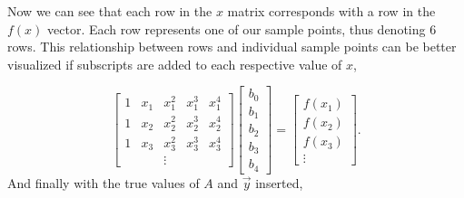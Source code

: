 \par Now we can see that each row in the $x$ matrix corresponds with a row in the $f(x)$ vector. Each row represents one of our sample points, thus denoting 6 rows. This relationship between rows and individual sample points can be better visualized if subscripts are added to each respective value of $x$,

\begin{equation} \label{LinAlgSubscript}
\begin{bmatrix}
1 & x_1 & x_1^2 & x_1^3 & x_1^4 \\
1 & x_2 & x_2^2 & x_2^3 & x_2^4 \\
1 & x_3 & x_3^2 & x_3^3 & x_3^4 \\
 & & \vdots & &
\end{bmatrix}
\begin{bmatrix}
b_0 \\
b_1 \\
b_2 \\
b_3 \\
b_4 
\end{bmatrix}
=
\begin{bmatrix}
f(x_1) \\ 
f(x_2) \\
f(x_3) \\ 
\vdots
\end{bmatrix}.
\end{equation}
And finally with the true values of $A$ and $\vec{y}$ inserted,

